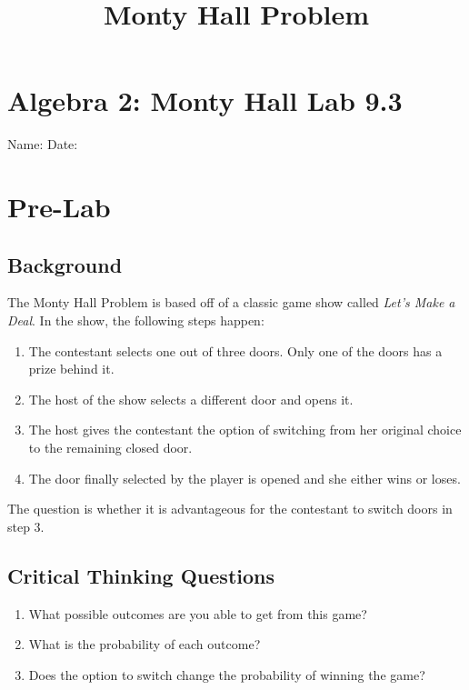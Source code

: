 \documentclass[11pt]{article}
\begin{document}
\title{Monty Hall Problem}
\section*{Algebra 2: Monty Hall Lab \hfill 9.3}
Name: \underline{\hspace{3in}} \hfill Date: \underline{\hspace{1in}}
\section*{Pre-Lab}
\subsection*{Background}
The Monty Hall Problem is based off of a classic game show called \textit{Let's Make a Deal}. In the show, the following steps happen:
\begin{enumerate}
\item The contestant selects one out of three  doors.  Only one of the doors has a prize behind it.
\item The host of the show selects a different door and opens it.
\item The host gives the contestant the option of switching from her original choice to the remaining closed door.
\item The door finally selected by the player is opened and she either wins or loses.
\end{enumerate}
The question is whether it is advantageous for the contestant to switch doors in step 3.

\subsection*{Critical Thinking Questions}
\begin{enumerate}
\item What possible outcomes are you able to get from this game?
\item What is the probability of each outcome?
\item Does the option to switch change the probability of winning the game?
\end{enumerate}
\end{document}

